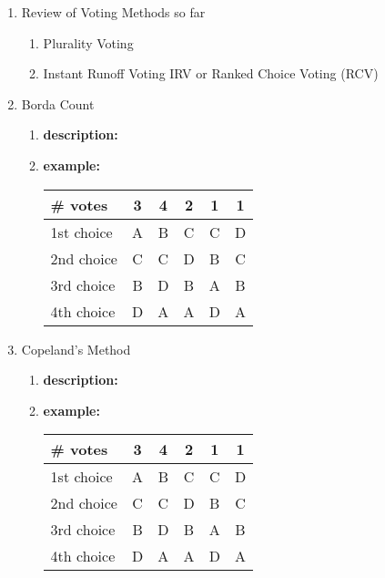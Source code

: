 \documentclass[12pt]{article}
\begin{document}
\begin{enumerate}
\item Review of Voting Methods so far\\
	\begin{enumerate}
	\item Plurality Voting
	\vfill
	\item Instant Runoff Voting IRV or Ranked Choice Voting (RCV)
	\vfill
	\end{enumerate}
\item Borda Count
	\begin{enumerate}
	\item \textbf{description:}
	\vspace{1.5in}
	\item \textbf{example:}
	\begin{tabular}{l || c |c|c|c|c}
\# votes&3&4&2&1&1\\
\hline
1st choice&A&B&C&C&D\\
2nd choice&C&C&D&B&C\\
3rd choice&B&D&B&A&B\\
4th choice&D&A&A&D&A\\
\end{tabular}
	\vfill
	\end{enumerate}
\newpage
\item Copeland's Method
	\begin{enumerate}
	\item \textbf{description:}
	\vspace{1.5in}
	\item \textbf{example:}
	\begin{tabular}{l || c |c|c|c|c}
\# votes&3&4&2&1&1\\
\hline
1st choice&A&B&C&C&D\\
2nd choice&C&C&D&B&C\\
3rd choice&B&D&B&A&B\\
4th choice&D&A&A&D&A\\
\end{tabular}
	\vfill
	
	\end{enumerate}

\end{enumerate}
\end{document}
